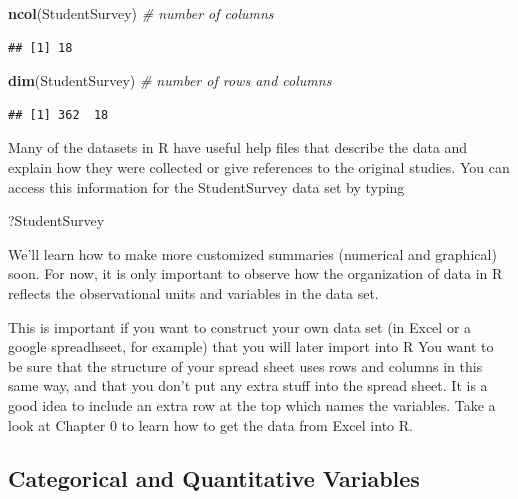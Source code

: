 \documentclass[]{book}
\newenvironment{Shaded}{\begin{snugshade}}{\end{snugshade}}
\newcommand{\CommentTok}[1]{\textcolor[rgb]{0.56,0.35,0.01}{\textit{#1}}}
\newcommand{\KeywordTok}[1]{\textcolor[rgb]{0.13,0.29,0.53}{\textbf{#1}}}
\newcommand{\NormalTok}[1]{#1}
\begin{document}
\begin{Shaded}
\begin{Highlighting}[]
\KeywordTok{ncol}\NormalTok{(StudentSurvey) }\CommentTok{# number of columns}
\end{Highlighting}
\end{Shaded}

\begin{verbatim}
## [1] 18
\end{verbatim}

\begin{Shaded}
\begin{Highlighting}[]
\KeywordTok{dim}\NormalTok{(StudentSurvey)  }\CommentTok{# number of rows and columns}
\end{Highlighting}
\end{Shaded}

\begin{verbatim}
## [1] 362  18
\end{verbatim}

Many of the datasets in R have useful help files that describe the data and explain how they were collected or give references to the original studies. You can access this information for the {StudentSurvey} data set by typing

\begin{Shaded}
\begin{Highlighting}[]
\NormalTok{?StudentSurvey}
\end{Highlighting}
\end{Shaded}

We'll learn how to make more customized summaries (numerical and graphical) soon. For now, it is only important to observe how the organization of data in R reflects the observational units and variables in the data set.

This is important if you want to construct your own data set (in Excel or a google spreadhseet, for example) that you will later import into R You want to be sure that the structure of your spread sheet uses rows and columns in this same way, and that you don't put any extra stuff into the spread sheet. It is a good idea to include an extra row at the top which names the variables. Take a look at Chapter 0 to learn how to get the data from Excel into R.

\hypertarget{categorical-and-quantitative-variables}{%
\subsection{Categorical and Quantitative Variables}\label{categorical-and-quantitative-variables}}
\end{document}
